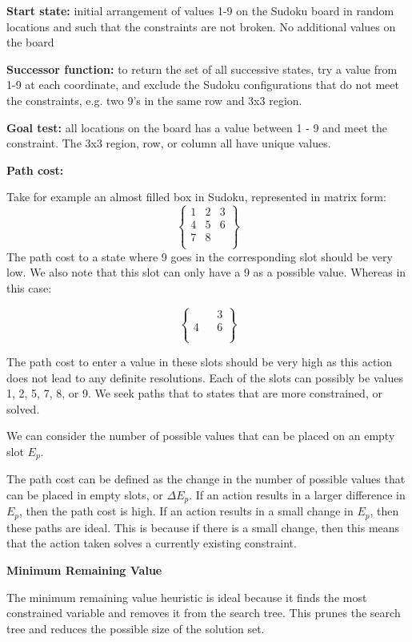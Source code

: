 \textbf{Start state:} initial arrangement of values 1-9 on the Sudoku board in random locations and such that the constraints are not broken. No additional values on the board

\textbf{Successor function:} to return the set of all successive states, try a value from 1-9 at each coordinate, and exclude the Sudoku configurations that do not meet the constraints, e.g. two 9's in the same row and 3x3 region.

\textbf{Goal test:} all locations on the board has a value between 1 - 9 and meet the constraint. The 3x3 region, row, or column all have unique values. 

\textbf{Path cost:} 

Take for example an almost filled box in Sudoku, represented in matrix form:
\[
\begin{Bmatrix}
	1 & 2 & 3 \\
	4 & 5 & 6 \\
	7 & 8 &  \\	
\end{Bmatrix}
\]
The path cost to a state where 9 goes in the corresponding slot should be very low. We also note that this slot can only have a 9 as a possible value. Whereas in this case:

\[
\begin{Bmatrix}
 &  & 3 \\
4 &  & 6 \\
 &  &  \\	
\end{Bmatrix}
\]

The path cost to enter a value in these slots should be very high as this action does not lead to any definite resolutions. Each of the slots can possibly be values 1, 2, 5, 7, 8, or 9. We seek paths that to states that are more constrained, or solved.

We can consider the number of possible values that can be placed on an empty slot $E_p$.

The path cost can be defined as the change in the number of possible values that can be placed in empty slots, or $\Delta E_p$. If an action results in a larger difference in $E_p$, then the path cost is high. If an action results in a small change in $E_p$, then these paths are ideal. This is because if there is a small change, then this means that the action taken solves a currently existing constraint.


\textbf{Minimum Remaining Value}


The minimum remaining value heuristic is ideal because it finds the most constrained variable and removes it from the search tree. This prunes the search tree and reduces the possible size of the solution set.

